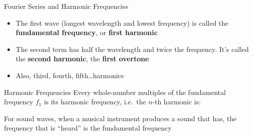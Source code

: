 \documentclass[12pt,aspectratio=169]{beamer}
\newcommand{\eq}[2]{\vspace{#1}{\Large\begin{displaymath}#2\end{displaymath}}}
\begin{document}
\begin{frame}{Fourier Series and Harmonic Frequencies}
  \begin{center}
    \vspace{-.3in}
    \hspace{.15in}
    \hspace{.15in}
  \end{center}

  \vspace{-.2in}
  \begin{itemize}
  \item The first wave (longest wavelength and lowest frequency) is called the
    \textbf{fundamental frequency}, or \textbf{first harmonic}
  \item The second term has half the wavelength and twice the frequency. It's
    called the \textbf{second harmonic}, the \textbf{first overtone}
  \item Also, third, fourth, fifth\ldots harmonics
  \end{itemize}
\end{frame}



\begin{frame}{Harmonic Frequencies}
    Every whole-number multiples of the fundamental frequency $f_1$ is its
    harmonic frequency, i.e.\ the $n$-th harmonic is:

    \eq{-.25in}{
      \boxed{f_n=nf_1}\quad n=1,2,3,\ldots
    }
    For sound waves, when a musical instrument produces a sound that has, the
    frequency that is ``heard'' is the fundamental frequency
\end{frame}
\end{document}
